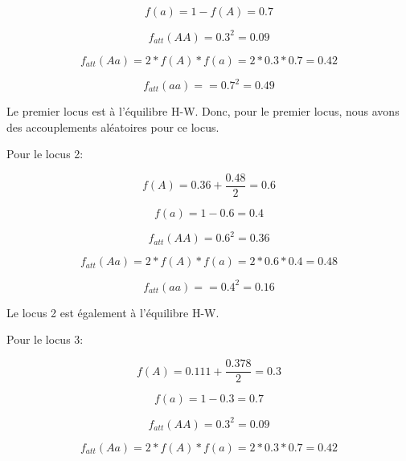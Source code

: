\documentclass{article}
\begin{document}
\begin{equation}
f(a) = 1 - f(A) = 0.7
\end{equation}

\begin{equation}
f_{att}(AA) = 0.3^2 = 0.09
\end{equation}

\begin{equation}
f_{att}(Aa) = 2*f(A)*f(a) = 2*0.3*0.7 = 0.42
\end{equation}

\begin{equation}
f_{att}(aa) =  = 0.7^2 = 0.49
\end{equation}

Le premier locus est à l'équilibre H-W. Donc, pour le premier locus, nous avons des accouplements aléatoires pour ce locus.

Pour le locus 2:

\begin{equation}
f(A) = 0.36 + \frac{0.48}{2} = 0.6
\end{equation}

\begin{equation}
f(a) = 1 - 0.6 = 0.4
\end{equation}

\begin{equation}
f_{att}(AA) = 0.6^2 = 0.36
\end{equation}

\begin{equation}
f_{att}(Aa) = 2*f(A)*f(a) = 2*0.6*0.4 = 0.48
\end{equation}

\begin{equation}
f_{att}(aa) =  = 0.4^2 = 0.16
\end{equation}

Le locus 2 est également à l'équilibre H-W.

Pour le locus 3:

\begin{equation}
f(A) = 0.111 + \frac{0.378}{2} = 0.3
\end{equation}

\begin{equation}
f(a) = 1 - 0.3 = 0.7
\end{equation}

\begin{equation}
f_{att}(AA) = 0.3^2 = 0.09
\end{equation}

\begin{equation}
f_{att}(Aa) = 2*f(A)*f(a) = 2*0.3*0.7 = 0.42
\end{equation}
\end{document}
